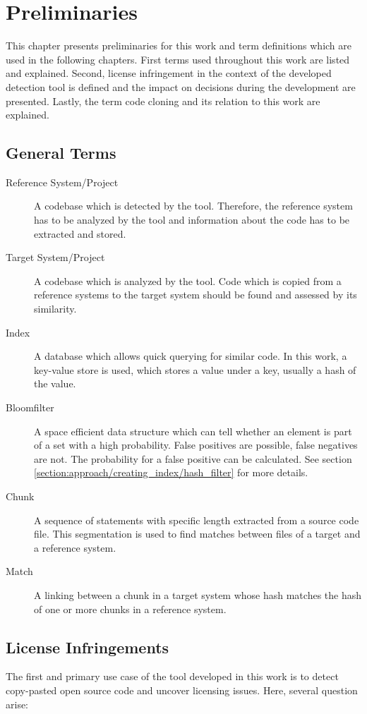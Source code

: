 
\chapter{Preliminaries}\label{chapter:preliminaries}
This chapter presents preliminaries for this work and term definitions which are used in the following chapters.
First terms used throughout this work are listed and explained.
Second, license infringement in the context of the developed detection tool is defined and the impact on decisions during the development are presented.
Lastly, the term code cloning and its relation to this work are explained.

\section{General Terms}\label{section:preliminaries/terms}
\begin{description}
	\item[Reference System/Project]
		A codebase which is detected by the tool. 
		Therefore, the reference system has to be analyzed by the tool and information about the code has to be extracted and stored.
	\item[Target System/Project]
		A codebase which is analyzed by the tool. 
		Code which is copied from a reference systems to the target system should be found and assessed by its similarity.
	\item[Index] 
		A database which allows quick querying for similar code.
		In this work, a key-value store is used, which stores a value under a key, usually a hash of the value.
	\item [Bloomfilter]
		A space efficient data structure which can tell whether an element is part of a set with a high probability. 
		False positives are possible, false negatives are not.
		The probability for a false positive can be calculated. See section \ref{section:approach/creating_index/hash_filter} for more details.
	\item [Chunk]
		A sequence of statements with specific length extracted from a source code file.
		This segmentation is used to find matches between files of a target and a reference system.
	\item [Match]
		A linking between a chunk in a target system whose hash matches the hash of one or more chunks in a reference system.
\end{description}

\section{License Infringements}\label{section:preliminaries/infringement}
The first and primary use case of the tool developed in this work is to detect copy-pasted open source code and uncover licensing issues.
Here, several question arise:

